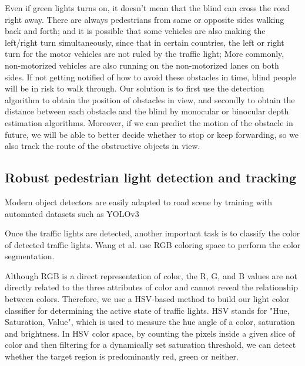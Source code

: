  Even if green lights turns on, it doesn't mean that the blind can cross the road right away. There are always pedestrians from same or opposite sides walking back and forth; and it is possible that some vehicles are also making the left/right turn simultaneously, since that in certain countries, the left or right turn for the motor vehicles are not ruled by the traffic light; More commonly, non-motorized vehicles are also running on the non-motorized lanes on both sides. If not getting notified of how to avoid these obstacles in time, blind people will be in risk to walk through. Our solution is to first use the detection algorithm to obtain the position of obstacles in view, and secondly to obtain the distance between each obstacle and the blind by monocular or binocular depth estimation algorithms. Moreover, if we can predict the motion of the obstacle in future, we will be able to better decide whether to stop or keep forwarding, so we also track the route of the obstructive objects in view.

\subsection{Robust pedestrian light detection and tracking}
 Modern object detectors are easily adapted to road scene by training with automated datasets such as  YOLOv3~\cite{redmon-farhadi:2018}



Once the traffic lights are detected, another important task is to classify the color of detected traffic lights. Wang et al. \cite{wang-et-al:2014} use RGB coloring space to perform the color segmentation.


Although RGB is a direct representation of color, the R, G, and B values are not directly related to the three attributes of color and cannot reveal the relationship between colors.
Therefore, we use a HSV-based method to build our light color classifier for determining the active state of traffic lights. HSV stands for "Hue, Saturation, Value", which is used to measure the hue angle of a color, saturation and brightness. In HSV color space, by counting the pixels inside a given slice of color and then filtering for a dynamically set saturation threshold, we can detect whether the target region is predominantly red, green or neither.



